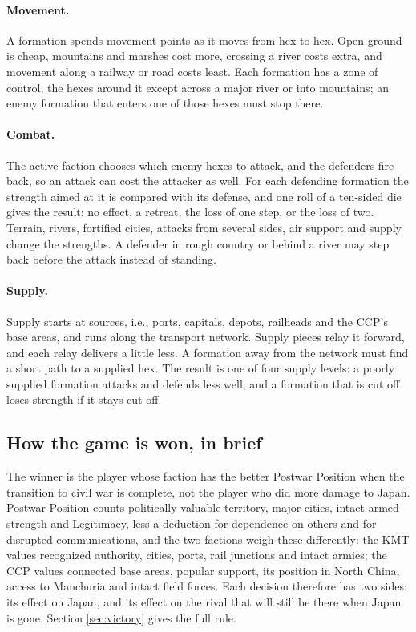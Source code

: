 \documentclass[11pt]{article}
\begin{document}
\paragraph{Movement.} A formation spends movement points as it moves from hex to hex. Open ground is cheap, mountains and marshes cost more, crossing a river costs extra, and movement along a railway or road costs least. Each formation has a zone of control, the hexes around it except across a major river or into mountains; an enemy formation that enters one of those hexes must stop there.

\paragraph{Combat.} The active faction chooses which enemy hexes to attack, and the defenders fire back, so an attack can cost the attacker as well. For each defending formation the strength aimed at it is compared with its defense, and one roll of a ten-sided die gives the result: no effect, a retreat, the loss of one step, or the loss of two. Terrain, rivers, fortified cities, attacks from several sides, air support and supply change the strengths. A defender in rough country or behind a river may step back before the attack instead of standing.

\paragraph{Supply.} Supply starts at sources, i.e., ports, capitals, depots, railheads and the CCP's base areas, and runs along the transport network. Supply pieces relay it forward, and each relay delivers a little less. A formation away from the network must find a short path to a supplied hex. The result is one of four supply levels: a poorly supplied formation attacks and defends less well, and a formation that is cut off loses strength if it stays cut off.

\subsection{How the game is won, in brief}
The winner is the player whose faction has the better Postwar Position when the transition to civil war is complete, not the player who did more damage to Japan. Postwar Position counts politically valuable territory, major cities, intact armed strength and Legitimacy, less a deduction for dependence on others and for disrupted communications, and the two factions weigh these differently: the KMT values recognized authority, cities, ports, rail junctions and intact armies; the CCP values connected base areas, popular support, its position in North China, access to Manchuria and intact field forces. Each decision therefore has two sides: its effect on Japan, and its effect on the rival that will still be there when Japan is gone. Section \ref{sec:victory} gives the full rule.
\end{document}
